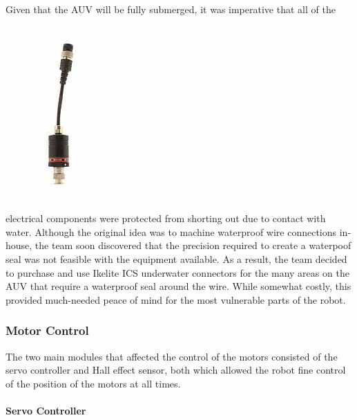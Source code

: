 \documentclass[12pt, letterpaper, twocolumn, titlepage]{article}
\begin{document}
Given that the AUV will be fully submerged, it was imperative that all of the
\begin{figure}
	\vspace{-30pt}
 	\flushright
   	\includegraphics[width=0.28\columnwidth]{Wiring}
   	\vspace{-50pt}
\end{figure}
electrical components were protected from shorting out due to contact with water. Although the original idea was to machine waterproof wire connections in-house, the team soon discovered that the precision required to create a waterpoof seal was not feasible with the equipment available. As a result, the team decided to purchase and use Ikelite ICS underwater connectors for the many areas on the AUV that require a waterproof seal around the wire. While somewhat costly, this provided much-needed peace of mind for the most vulnerable parts of the robot.

\subsubsection{Motor Control}

The two main modules that affected the control of the motors consisted of the servo controller and Hall effect sensor, both which allowed the robot fine control of the position of the motors at all times.

\paragraph{Servo Controller}
\end{document}
